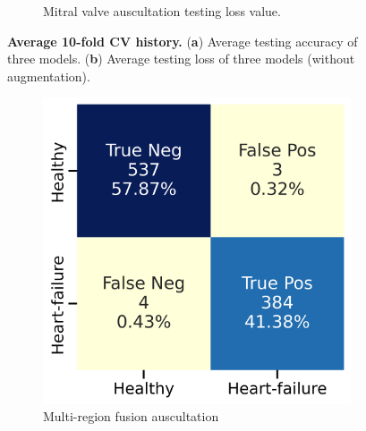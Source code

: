 \begin{figure}[h]
\begin{subfigure}{0.48\linewidth}
		\caption{Mitral valve auscultation testing loss value.}
		\label{FIG:Average curve.b}%
	\end{subfigure}
\caption{\textbf{Average 10-fold CV history.} (\textbf{a}) Average testing accuracy of three models. (\textbf{b}) Average testing loss of three models (without augmentation).}
\label{FIG:Average curve}
\end{figure}

\begin{figure}[htbp]
    \centering
    \begin{subfigure}[b]{0.45\textwidth}
        \centering
        \includegraphics[width=\textwidth]{./figs/results/Confusion Matrix 2.png}
        \caption{Multi-region fusion auscultation}
        \label{fig:mitral_valve_2}
    \end{subfigure}
    \hfill
    \begin{subfigure}[b]{0.45\textwidth}
        \centering

\end{subfigure}
\end{figure}
